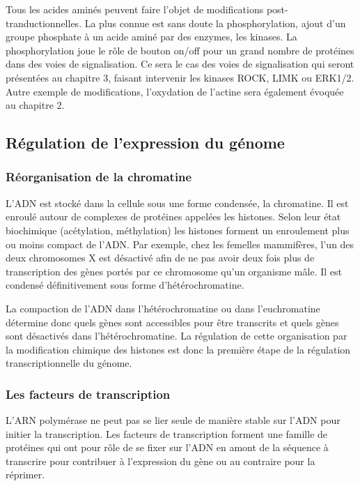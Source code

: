 Tous les acides aminés peuvent faire l'objet de modifications post-tranductionnelles. La plus connue est sans doute la phosphorylation, ajout d'un groupe phosphate à un acide aminé par des enzymes, les kinases. La phosphorylation joue le rôle de bouton on/off pour un grand nombre de protéines dans des voies de signalisation. Ce sera le cas des voies de signalisation qui seront présentées au chapitre 3, faisant intervenir les kinases ROCK, LIMK ou ERK1/2. 
Autre exemple de modifications, l'oxydation de l'actine sera également évoquée au chapitre 2. 


\subsection{Régulation de l'expression du génome}

\subsubsection{Réorganisation de la chromatine}

L'ADN est stocké dans la cellule sous une forme condensée, la chromatine. Il est enroulé autour de complexes de protéines appelées les histones. Selon leur état biochimique (acétylation, méthylation) les histones forment un enroulement plus ou moins compact de l'ADN. Par exemple, chez les femelles mammifères, l'un des deux chromosomes X est désactivé afin de ne pas avoir deux fois plus de transcription des gènes portés par ce chromosome qu'un organisme mâle. Il est condensé définitivement sous forme d'hétérochromatine. 

La compaction de l'ADN dans l'hétérochromatine ou dans l'euchromatine détermine donc quels gènes sont accessibles pour être transcrits et quels gènes sont désactivés dans l'hétérochromatine. 
La régulation de cette organisation par la modification chimique des histones est donc la première étape de la régulation transcriptionnelle du génome. 

\subsubsection{Les facteurs de transcription}

L'ARN polymérase ne peut pas se lier seule de manière stable sur l'ADN pour initier la transcription. 
Les facteurs de transcription forment une famille de protéines qui ont pour rôle de se fixer sur l'ADN en amont de la séquence à transcrire pour contribuer à l'expression du gène ou au contraire pour la réprimer. 

